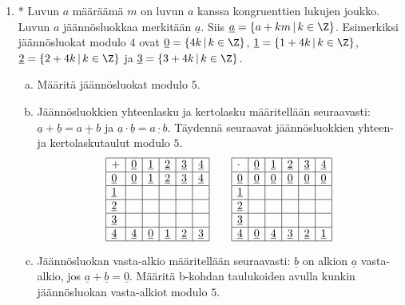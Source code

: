 \begin{enumerate}
\item * %
Luvun $a$ määräämä  $m$ on luvun $a$ kanssa kongruenttien lukujen joukko. Luvun $a$ jäännösluokkaa merkitään $\underline{a}$. Siis $\underline{a} = \{a + km\, |\, k\in \Z\}$. Esimerkiksi jäännösluokat modulo $4$ ovat $\underline{0}=\{4k\, |\, k\in \Z\}$, $\underline{1}=\{1+4k\, |\, k\in \Z\}$, $\underline{2}=\{2+4k\, |\, k\in \Z\}$ ja $\underline{3}=\{3+4k\, |\, k\in \Z\}$.
\begin{enumerate}[a)]
\item Määritä jäännösluokat modulo $5$.
\item Jäännösluokkien yhteenlasku ja kertolasku määritellään seuraavasti: $\underline{a} + \underline{b} = \underline{a + b}$ ja $\underline{a} \cdot \underline{b} = \underline{a\cdot b}$. Täydennä seuraavat jäännösluokkien yhteen- ja kertolaskutaulut modulo $5$.
\[
\begin{array}{|l|l|l|l|l|l|}
\hline
+& \underline{0} & \underline{1} & \underline{2} & \underline{3} & \underline{4} \\ \hline
\underline{0} & \underline{0} & \underline{1} & \underline{2} &  \underline{3} & \underline{4}  
\\ \hline
 \underline{1} &&&&& \\ \hline
 \underline{2} &&&&& \\ \hline
 \underline{3} &&&&& \\ \hline
\underline{4} & \underline{4} & \underline{0} & \underline{1} &  \underline{2} & \underline{3}  
\\ \hline
\end{array}
\qquad
\begin{array}{|l|l|l|l|l|l|}
\hline
\cdot& \underline{0} & \underline{1} & \underline{2} & \underline{3} & \underline{4} \\ \hline
\underline{0} & \underline{0} & \underline{0} & \underline{0} &  \underline{0} & \underline{0}  
\\ \hline
 \underline{1} &&&&& \\ \hline
 \underline{2} &&&&& \\ \hline
 \underline{3} &&&&& \\ \hline
\underline{4} & \underline{0} & \underline{4} & \underline{3} &  \underline{2} & \underline{1}  
\\ \hline
\end{array}
\]
\item Jäännösluokan vasta-alkio määritellään seuraavasti: $\underline{b}$ on alkion $\underline{a}$ vasta-alkio, jos $\underline{a} + \underline{b} = \underline{0}$. Määritä b-kohdan  taulukoiden avulla kunkin jäännösluokan vasta-alkiot modulo $5$.

\end{enumerate}
\end{enumerate}
